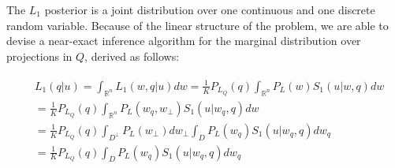 \documentclass[9pt,twocolumn,twoside,lineno]{pnas-new}
\begin{document}
{	%












	The $L_1$ posterior is a joint distribution over one continuous and one discrete random variable. 
	Because of the linear structure of the problem, we are able to devise a near-exact inference algorithm for the marginal distribution over projections in $Q$, derived as follows:

























	 \begin{align}
	 \begin{split}
	&L_1(q | u) = \int_{\mathbb{R}^n}L_1(w,q | u) dw = \frac{1}{K}P_{L_Q}(q) \int_{\mathbb{R}^n}P_L(w)S_1(u|w,q) dw \\
	&= \frac{1}{K}P_{L_Q}(q) \int_{\mathbb{R}^n}P_L(w_q, w_\bot)S_1(u|w_q,q) dw \\
	&= \frac{1}{K}P_{L_Q}(q) \int_{D^\bot}P_L(w_\bot) dw_\bot \int_{D}P_L(w_q) S_1(u|w_q,q) dw_q \\
	&= \frac{1}{K}P_{L_Q}(q)  \int_{D}P_L(w_q) S_1(u|w_q,q) dw_q\nonumber
	\end{split}
	 \end{align}
	



}
\end{document}
